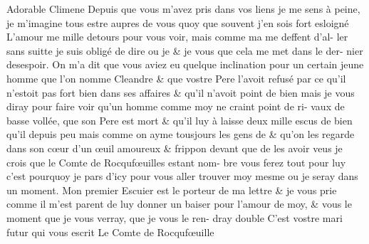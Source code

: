 \documentclass{article}
\begin{document}
\begin{ekddrama}
\begin{speech}
Adorable Climene Depuis que vous m'avez
pris dans vos liens\app{\lem[wit=A]{,}\rdg[wit=B, alt=\emph{om.}]{}} je me sens à peine, je 
m'imagine  tous  estre aupres de 
vous\app{\lem[wit=A]{,}\rdg[wit=B, alt=\emph{om.}]{}} quoy que souvent j'en sois fort esloigné 
L'amour me  mille detours pour vous 
voir, mais comme ma  me deffent d'al-
ler sans suitte\app{\lem[wit=A]{,}\rdg[wit=B, alt=\emph{om.}]{}} je suis obligé de dire ou je \app{\lem[wit=A]{,}\rdg[wit=B, alt=\emph{om.}]{}}
\& je vous \app{\lem[wit=A]{,}\rdg[wit=B, alt=\emph{om.}]{}} que cela me met dans le der-
nier desespoir. On m'a dit que vous aviez eu
quelque inclination\app{\lem[wit=A]{,}\rdg[wit=B, alt=\emph{om.}]{}} pour un certain jeune
homme\app{\lem[wit=A]{,}\rdg[wit=B, alt=\emph{om.}]{}} que l'on nomme Cleandre\app{\lem[wit=A]{,}\rdg[wit=B, alt=\emph{om.}]{}} \& que vostre
Pere l'avoit refusé\app{\lem[wit=A]{,}\rdg[wit=B, alt=\emph{om.}]{}} par ce qu'il n'estoit pas fort
bien dans ses affaires\app{\lem[wit=A]{,}\rdg[wit=B, alt=\emph{om.}]{}} \& qu'il n'avoit point
de bien\app{\lem[wit=A]{;}\rdg[wit=B]{:}} mais je vous diray\app{\lem[wit=A]{,}\rdg[wit=B, alt=\emph{om.}]{}} pour faire voir
qu'un homme comme moy ne craint point de ri-
vaux de  basse vollée, que son Pere est mort\app{\lem[wit=A]{,}\rdg[wit=B, alt=\emph{om.}]{}}
\& qu'il luy à laisse deux  mille escus de
bien\app{\lem[wit=A]{,}\rdg[wit=B, alt=\emph{om.}]{}} qu'il  depuis peu\app{\lem[wit=A]{;}\rdg[wit=B, alt=\emph{om.}]{}} mais comme on
ayme tousjours les gens de  \& qu'on les
regarde dans son cœur d'un œuil amoureux \&
frippon\app{\lem[wit=A]{,}\rdg[wit=B, alt=\emph{om.}]{}} devant que de les avoir veus\app{\lem[wit=A]{,}\rdg[wit=B, alt=\emph{om.}]{}} je crois
que le Comte de Rocqufœuilles estant  nom-
bre\app{\lem[wit=A]{,}\rdg[wit=B, alt=\emph{om.}]{}} vous ferez tout  pour luy\app{\lem[wit=A]{;}\rdg[wit=B, alt=\emph{om.}]{}} c'est pourquoy je
pars d'icy pour vous aller trouver moy mesme\app{\lem[wit=A]{,}\rdg[wit=B, alt=\emph{om.}]{}}
ou je seray dans un moment. Mon premier Escuier est le porteur de ma lettre\app{\lem[wit=A]{,}\rdg[wit=B, alt=\emph{om.}]{}} \& je vous prie
comme il m'est parent\app{\lem[wit=A]{,}\rdg[wit=B, alt=\emph{om.}]{}} de luy donner un baiser
pour l'amour de moy, \&  vous  le
moment que je vous verray, que je vous le ren-
dray  double C'est vostre mari futur qui
vous escrit
Le Comte de Rocqufœuille


\end{speech}
\end{ekddrama}
\end{document}
